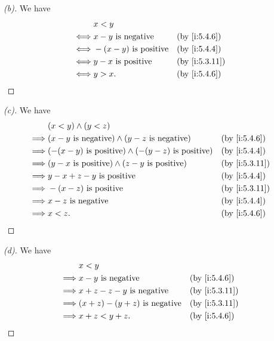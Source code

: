 \begin{proof}[(b)]
  We have
  \begin{align*}
         & x < y                                           \\
    \iff & x - y \text{ is negative}    &  & \by{i:5.4.6}  \\
    \iff & -(x - y) \text{ is positive} &  & \by{i:5.4.4}  \\
    \iff & y - x \text{ is positive}    &  & \by{i:5.3.11} \\
    \iff & y > x.                       &  & \by{i:5.4.6}
  \end{align*}
\end{proof}

\begin{proof}[(c)]
  We have
  \begin{align*}
             & (x < y) \land (y < z)                                                                  \\
    \implies & (x - y \text{ is negative}) \land (y - z \text{ is negative})       &  & \by{i:5.4.6}  \\
    \implies & (-(x - y) \text{ is positive}) \land (-(y - z) \text{ is positive}) &  & \by{i:5.4.4}  \\
    \implies & (y - x \text{ is positive}) \land (z - y \text{ is positive})       &  & \by{i:5.3.11} \\
    \implies & y - x + z - y \text{ is positive}                                   &  & \by{i:5.4.4}  \\
    \implies & -(x - z) \text{ is positive}                                        &  & \by{i:5.3.11} \\
    \implies & x - z \text{ is negative}                                           &  & \by{i:5.4.4}  \\
    \implies & x < z.                                                              &  & \by{i:5.4.6}
  \end{align*}
\end{proof}

\begin{proof}[(d)]
  We have
  \begin{align*}
             & x < y                                                    \\
    \implies & x - y \text{ is negative}             &  & \by{i:5.4.6}  \\
    \implies & x + z - z - y \text{ is negative}     &  & \by{i:5.3.11} \\
    \implies & (x + z) - (y + z) \text{ is negative} &  & \by{i:5.3.11} \\
    \implies & x + z < y + z.                        &  & \by{i:5.4.6}
  \end{align*}
\end{proof}

